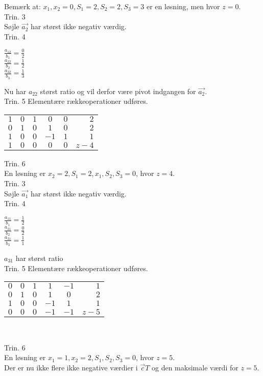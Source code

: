 \begin{eks}
Bemærk at: $x_1,x_2=0,S_1=2, S_2=2, S_3=3$ er en løsning, men hvor $z=0$.\\
Trin. 3\\
Søjle $\vec{a_2}$ har størst ikke negativ værdig.\\
Trin. 4\\
\begin{center}
$\frac{a_{1 2}}{b_1}=\frac{0}{2}$\\
$\frac{a_{2 2}}{b_2}=\frac{1}{2}$\\
$\frac{a_{3 2}}{b_3}=\frac{1}{3}$\\
\end{center}
Nu har $a_{2 2}$ størst ratio og vil derfor være pivot indgangen for $\vec{a_2}$.\\
Trin. 5
Elementære rækkeoperationer udføres.\\
\begin{center}
\begin{tabular}{| l  c  | c  c  c | r |}
\hline
$1$&$0$&$1$&$0$&$0$&$2$\\
$0$&$1$&$0$&$1$&$0$&$2$\\
$1$&$0$&$0$&$-1$&$1$&$1$\\ \hline
$1$&$0$&$0$&$0$&$0$&$z-4$\\
\hline
\end{tabular}
\end{center}
Trin. 6\\ 
En løsning er $x_2=2, S_1=2, x_1, S_2, S_3=0$, hvor $z=4$.\\
Trin. 3\\
Søjle $\vec{a_1}$ har størst ikke negativ værdig.\\
Trin. 4\\
\begin{center}
$\frac{a_{1 1}}{b_1}=\frac{1}{2}$\\
$\frac{a_{2 1}}{b_2}=\frac{0}{2}$\\
$\frac{a_{3 1}}{b_3}=\frac{1}{1}$\\
\end{center}
$a_{3 1}$ har størst ratio \\
Trin. 5 Elementære rækkeoperationer udføres.\\
\begin{center}
\begin{tabular}{| l  c  | c  c  c | r |}
\hline
$0$&$0$&$1$&$1$&$-1$&$1$\\
$0$&$1$&$0$&$1$&$0$&$2$\\
$1$&$0$&$0$&$-1$&$1$&$1$\\ \hline
$0$&$0$&$0$&$-1$&$-1$&$z-5$\\
\hline
\end{tabular}\\
\end{center}
Trin. 6 \\
En løsning er $x_1=1, x_2=2, S_1, S_2, S_3=0$, hvor $z=5$.\\
Der er nu ikke flere ikke negative værdier i $\vec{c}T$ og den maksimale værdi for $z=5$.
\end{eks}






